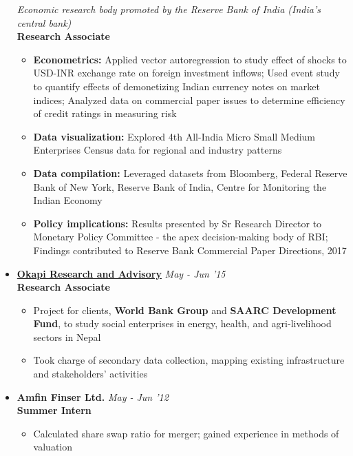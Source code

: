 \documentclass[10pt,a4paper]{article}
\begin{document}
\begin{itemize}
	\textit{Economic research body promoted by the Reserve Bank of India (India's central bank)} \\
	\textbf{Research Associate}	
	\vspace{-0.5em}
		\begin{itemize}
		\itemsep-0.15em
			\item \textbf{Econometrics: }Applied vector autoregression to study effect of shocks to USD-INR exchange rate on foreign investment inflows; Used event study to quantify effects of demonetizing Indian currency notes on market indices; Analyzed data on commercial paper issues to determine efficiency of credit ratings in measuring risk
			\item \textbf{Data visualization: }Explored 4th All-India Micro Small Medium Enterprises Census data for regional and industry patterns 
			\item \textbf{Data compilation: }Leveraged datasets from Bloomberg, Federal Reserve Bank of New York, Reserve Bank of India, Centre for Monitoring the Indian Economy
			\item \textbf{Policy implications: }Results presented by Sr Research Director to Monetary Policy Committee - the apex decision-making body of RBI; Findings contributed to Reserve Bank Commercial Paper Directions, 2017
 \vspace{-0.35em}
		\end{itemize}
\item{\href{http://www.okapia.co/}{\fontsize{11}{11}\selectfont\textbf{Okapi Research and Advisory}}} \hfill \textit{May - Jun '15}\\
	\textbf{Research Associate}		
	\vspace{-0.5em}
		\begin{itemize}
		\itemsep-0.15em
			\item Project for clients, \textbf{World Bank Group} and \textbf{SAARC Development Fund}, to study social enterprises in energy, health, and agri-livelihood sectors in Nepal 
			\item Took charge of secondary data collection, mapping existing infrastructure and stakeholders' activities
		\vspace{-0.35em}
		\end{itemize}
\item {\fontsize{11}{11}\selectfont\textbf{Amfin Finser Ltd.}} \hfill \textit{May - Jun '12}\\
	\textbf{Summer Intern}	
	\vspace{-0.5em}
		\begin{itemize}
		\itemsep-0.20em
			\item Calculated share swap ratio for merger; gained experience in methods of valuation
		\vspace{-0.35em}
		\end{itemize}
\end{itemize}
\end{document}
